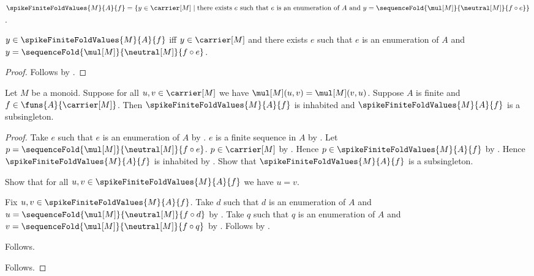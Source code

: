 \begin{definition}\label{spike_finite_fold_values}
    $\spikeFiniteFoldValues{M}{A}{f}=
        \{y\in\carrier[M]\mid
            \text{there exists $e$ such that
                $e$ is an enumeration of $A$ and
                $y=\sequenceFold{\mul[M]}{\neutral[M]}{f\circ e}$}\}$.
\end{definition}

\begin{proposition}\label{spike_finite_fold_values_iff}
    $y\in\spikeFiniteFoldValues{M}{A}{f}$ iff
        $y\in\carrier[M]$ and there exists $e$ such that
            $e$ is an enumeration of $A$ and
            $y=\sequenceFold{\mul[M]}{\neutral[M]}{f\circ e}$.
\end{proposition}
\begin{proof}
    Follows by .
\end{proof}

\begin{theorem}\label{spike_finite_fold_values_inhabited_subsingleton}
    Let $M$ be a monoid.
    Suppose for all $u,v\in\carrier[M]$ we have
        $\mul[M](u,v)=\mul[M](v,u)$.
    Suppose $A$ is finite and $f\in\funs{A}{\carrier[M]}$.
    Then $\spikeFiniteFoldValues{M}{A}{f}$ is inhabited and
        $\spikeFiniteFoldValues{M}{A}{f}$ is a subsingleton.
\end{theorem}
\begin{proof}
    Take $e$ such that $e$ is an enumeration of $A$ by
        .
    $e$ is a finite sequence in $A$ by
        .
    Let $p=\sequenceFold{\mul[M]}{\neutral[M]}{f\circ e}$.
    $p\in\carrier[M]$ by .
    Hence $p\in\spikeFiniteFoldValues{M}{A}{f}$ by
        .
    Hence $\spikeFiniteFoldValues{M}{A}{f}$ is inhabited by \auto.
    Show that $\spikeFiniteFoldValues{M}{A}{f}$ is a subsingleton.
    \begin{subproof}
        Show that for all $u,v\in\spikeFiniteFoldValues{M}{A}{f}$
            we have $u=v$.
        \begin{subproof}
            Fix $u,v\in\spikeFiniteFoldValues{M}{A}{f}$.
            Take $d$ such that $d$ is an enumeration of $A$ and
                $u=\sequenceFold{\mul[M]}{\neutral[M]}{f\circ d}$ by
                .
            Take $q$ such that $q$ is an enumeration of $A$ and
                $v=\sequenceFold{\mul[M]}{\neutral[M]}{f\circ q}$ by
                .
            Follows by .
        \end{subproof}
        Follows.
    \end{subproof}
    Follows.
\end{proof}

